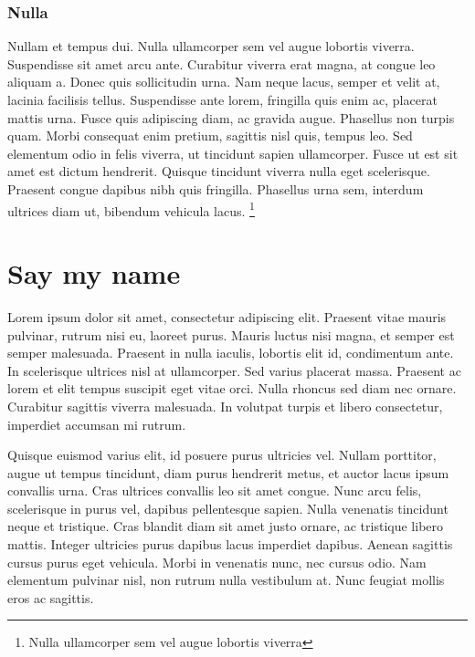 \documentclass[a4paper,12pt]{article}
\begin{document}
\subsubsection*{Nulla}
Nullam et tempus dui. Nulla ullamcorper sem vel augue lobortis viverra. Suspendisse sit amet arcu ante. Curabitur viverra erat magna, at congue leo aliquam a. Donec quis sollicitudin urna. Nam neque lacus, semper et velit at, lacinia facilisis tellus. Suspendisse ante lorem, fringilla quis enim ac, placerat mattis urna. Fusce quis adipiscing diam, ac gravida augue. Phasellus non turpis quam. Morbi consequat enim pretium, sagittis nisl quis, tempus leo. Sed elementum odio in felis viverra, ut tincidunt sapien ullamcorper. Fusce ut est sit amet est dictum hendrerit. Quisque tincidunt viverra nulla eget scelerisque. Praesent congue dapibus nibh quis fringilla. Phasellus urna sem, interdum ultrices diam ut, bibendum vehicula lacus. \footnote{Nulla ullamcorper sem vel augue lobortis viverra}


\newpage
\section{Say my name}

Lorem ipsum dolor sit amet, consectetur adipiscing elit. Praesent vitae mauris pulvinar, rutrum nisi eu, laoreet purus. Mauris luctus nisi magna, et semper est semper malesuada. Praesent in nulla iaculis, lobortis elit id, condimentum ante. In scelerisque ultrices nisl at ullamcorper. Sed varius placerat massa. Praesent ac lorem et elit tempus suscipit eget vitae orci. Nulla rhoncus sed diam nec ornare. Curabitur sagittis viverra malesuada. In volutpat turpis et libero consectetur, imperdiet accumsan mi rutrum.

Quisque euismod varius elit, id posuere purus ultricies vel. Nullam porttitor, augue ut tempus tincidunt, diam purus hendrerit metus, et auctor lacus ipsum convallis urna. Cras ultrices convallis leo sit amet congue. Nunc arcu felis, scelerisque in purus vel, dapibus pellentesque sapien. Nulla venenatis tincidunt neque et tristique. Cras blandit diam sit amet justo ornare, ac tristique libero mattis. Integer ultricies purus dapibus lacus imperdiet dapibus. Aenean sagittis cursus purus eget vehicula. Morbi in venenatis nunc, nec cursus odio. Nam elementum pulvinar nisl, non rutrum nulla vestibulum at. Nunc feugiat mollis eros ac sagittis.
\end{document}
